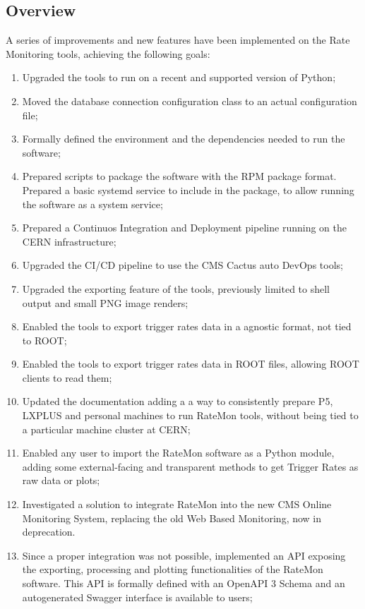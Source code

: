 \subsection{Overview}

A series of improvements and new features have been implemented on the Rate Monitoring tools, achieving the following goals:

\begin{enumerate}

\item Upgraded the tools to run on a recent and supported version of Python;
\item Moved the database connection configuration class to an actual configuration file;
\item Formally defined the environment and the dependencies needed to run the software;
\item Prepared scripts to package the software with the RPM package format. Prepared a basic systemd service to include in the package, to allow running the software as a system service;
\item Prepared a Continuos Integration and Deployment pipeline running on the CERN infrastructure;
\item Upgraded the CI/CD pipeline to use the CMS Cactus auto DevOps tools;
\item Upgraded the exporting feature of the tools, previously limited to shell output and small PNG image renders;
\item Enabled the tools to export trigger rates data in a agnostic format, not tied to ROOT;
\item Enabled the tools to export trigger rates data in ROOT files, allowing ROOT clients to read them;
\item Updated the documentation adding a a way to consistently prepare P5, LXPLUS and personal machines to run RateMon tools, without being tied to a particular machine cluster at CERN;
\item Enabled any user to import the RateMon software as a Python module, adding some external-facing and transparent methods to get Trigger Rates as raw data or plots;
\item Investigated a solution to integrate RateMon into the new CMS Online Monitoring System, replacing the old Web Based Monitoring, now in deprecation.
\item Since a proper integration was not possible, implemented an API exposing the exporting, processing and plotting functionalities of the RateMon software. This API is formally defined with an OpenAPI 3 Schema and an autogenerated Swagger interface is available to users;

\end{enumerate}
